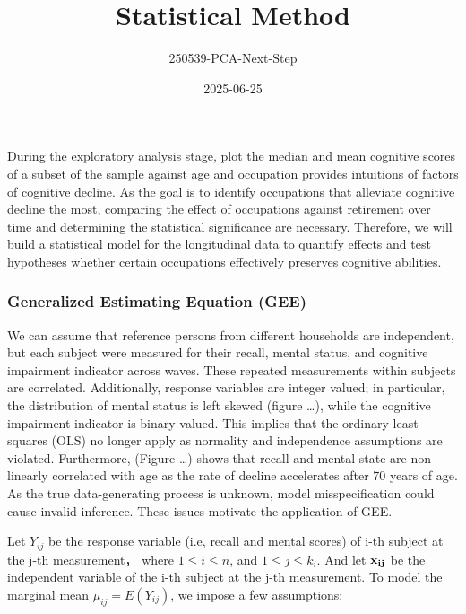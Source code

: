 \documentclass[
]{article}
\title{Statistical Method}
\author{250539-PCA-Next-Step}
\date{2025-06-25}
\begin{document}
\maketitle

During the exploratory analysis stage, plot the median and mean
cognitive scores of a subset of the sample against age and occupation
provides intuitions of factors of cognitive decline. As the goal is to
identify occupations that alleviate cognitive decline the most,
comparing the effect of occupations against retirement over time and
determining the statistical significance are necessary. Therefore, we
will build a statistical model for the longitudinal data to quantify
effects and test hypotheses whether certain occupations effectively
preserves cognitive abilities.

\subsubsection{Generalized Estimating Equation (GEE)}

We can assume that reference persons from different households are
independent, but each subject were measured for their recall, mental
status, and cognitive impairment indicator across waves. These repeated
measurements within subjects are correlated. Additionally, response
variables are integer valued; in particular, the distribution of mental
status is left skewed (figure \ldots), while the cognitive impairment
indicator is binary valued. This implies that the ordinary least squares
(OLS) no longer apply as normality and independence assumptions are
violated. Furthermore, (Figure \ldots) shows that recall and mental
state are non-linearly correlated with age as the rate of decline
accelerates after 70 years of age. As the true data-generating process
is unknown, model misspecification could cause invalid inference. These
issues motivate the application of GEE.

Let \(Y_{ij}\) be the response variable (i.e, recall and mental scores)
of i-th subject at the j-th measurement， where \(1 \leq i \leq n\), and
\(1 \leq j \leq k_i\). And let \(\bf x_{ij}\) be the independent
variable of the i-th subject at the j-th measurement. To model the
marginal mean \(\mu_{ij} = E(Y_{ij})\), we impose a few assumptions:
\end{document}
